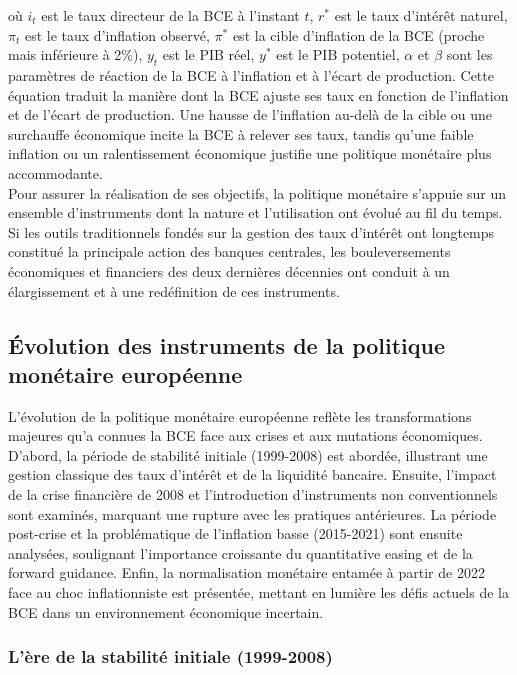 où  \( i_t \) est le taux directeur de la BCE à l’instant \( t \), \( r^* \) est le taux d’intérêt naturel, \( \pi_t \) est le taux d’inflation observé, \( \pi^* \) est la cible d’inflation de la BCE (proche mais inférieure à 2\%), \( y_t \) est le PIB réel, \( y^* \) est le PIB potentiel, \( \alpha \) et \( \beta \) sont les paramètres de réaction de la BCE à l’inflation et à l'écart de production. Cette équation traduit la manière dont la BCE ajuste ses taux en fonction de l’inflation et de l’écart de production. Une hausse de l’inflation au-delà de la cible ou une surchauffe économique incite la BCE à relever ses taux, tandis qu’une faible inflation ou un ralentissement économique justifie une politique monétaire plus accommodante.\\

Pour assurer la réalisation de ses objectifs, la politique monétaire s’appuie sur un ensemble d’instruments dont la nature et l’utilisation ont évolué au fil du temps. Si les outils traditionnels fondés sur la gestion des taux d’intérêt ont longtemps constitué la principale action des banques centrales, les bouleversements économiques et financiers des deux dernières décennies ont conduit à un élargissement et à une redéfinition de ces instruments.

\subsection{Évolution des instruments de la politique monétaire européenne}

L’évolution de la politique monétaire européenne reflète les transformations majeures qu’a connues la BCE face aux crises et aux mutations économiques. D’abord, la période de stabilité initiale (1999-2008) est abordée, illustrant une gestion classique des taux d’intérêt et de la liquidité bancaire. Ensuite, l’impact de la crise financière de 2008 et l’introduction d’instruments non conventionnels sont examinés, marquant une rupture avec les pratiques antérieures. La période post-crise et la problématique de l’inflation basse (2015-2021) sont ensuite analysées, soulignant l’importance croissante du quantitative easing et de la forward guidance. Enfin, la normalisation monétaire entamée à partir de 2022 face au choc inflationniste est présentée, mettant en lumière les défis actuels de la BCE dans un environnement économique incertain.\\

\subsubsection{L'ère de la stabilité initiale (1999-2008)}

